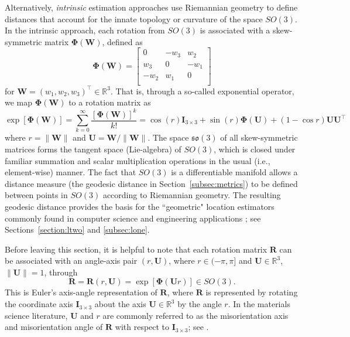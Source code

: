 Alternatively, \textit{intrinsic} estimation approaches use Riemannian geometry to define distances that account for the innate topology or curvature of the space $SO(3)$.  In the intrinsic approach, each rotation from $SO(3)$ is
associated with a skew-symmetric matrix $\bm{\Phi}(\bm{W})$, defined  as
\[
  \bm{\Phi}(\bm{W}) = \left[ \begin{array}{ccc} 0 & -w_3 & w_2\\
  w_3 & 0 & -w_1\\
 - w_2 & w_1 & 0\\
  \end{array}
 \right]
\]
for $\bm{W}=(w_1, w_2, w_3)^\top \in \mathbb{R}^3$. That is, through a so-called exponential operator,
we map  $\bm{\Phi}(\bm{W})$ to a rotation matrix as
\[
  \exp[\bm{\Phi}(\bm{W})] = \sum\limits_{k=0}^\infty \frac{[\bm{\Phi}(\bm{W})]^k}{k!}=\cos(r)\bm{I}_{3\times3} + \sin(r) \bm{\Phi}(\bm{U}) + (1-\cos r) \bm{U} \bm{U}^\top
\]
where $r=\|\bm{W}\|$ and $\bm{U} =\bm{W}/\|\bm{W}\| $.  The space $\mathfrak{so}(3)$ of all skew-symmetric matrices forms the tangent space (Lie-algebra) of $SO(3)$, which is closed under familiar summation and scalar multiplication operations in the usual (i.e., element-wise) manner. The fact that $SO(3)$ is a differentiable manifold allows a distance measure (the geodesic distance in Section~\ref{subsec:metrics}) to be defined between points in $SO(3)$ according to Riemannian geometry. The resulting geodesic distance provides the basis for the ``geometric" location estimators commonly found in computer science \citep{fletcher08, fletcher09, hartley11} and engineering applications \citep{manton04}; see Sections~\ref{section:ltwo} and \ref{subsec:lone}.

Before leaving this section, it is helpful to note that each rotation matrix $\bm{R}$ can be associated with an angle-axis 
pair $(r,\bm{U})$, where $r\in(-\pi,\pi]$ and $\bm{U}\in\mathbb{R}^3$, $\|\bm{U}\|=1$, through
\begin{equation}
\label{eqn:angleaxis}
 \bm{R} = \bm{R}(r,\bm{U}) = \exp[\bm\Phi(\bm{U} r)] \in SO(3).
\end{equation}
This is Euler's axis-angle representation of $\bm{R}$, where $\bm{R}$ is represented by rotating the coordinate axis $\bm{I}_{3 \times 3}$ about the axis $\bm{U}\in\mathbb{R}^3$ by the angle $r$. In the materials science literature,
$\bm{U}$ and $r$ are commonly referred to as the misorientation axis and misorientation angle of $\bm R$ with respect to  $\bm{I}_{3 \times 3}$; see \cite{randle03}.


